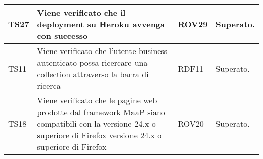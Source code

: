 \begin{center}
\begin{longtable}{|p{2cm}|p{7cm}|p{2cm}|p{2cm}|}
\midrule
TS27
& Viene verificato che il deployment su Heroku avvenga con successo
& ROV29
& Superato.\\


\midrule
TS11
& Viene verificato che l'utente business autenticato possa ricercare una collection attraverso la barra di ricerca
& RDF11
& Superato.\\


\midrule
TS18
& Viene verificato che le pagine web prodotte dal framework MaaP siano compatibili con la versione 24.x o superiore di Firefox
versione 24.x o superiore di Firefox
& ROV20
& Superato.\\


\end{longtable}
\end{center}

